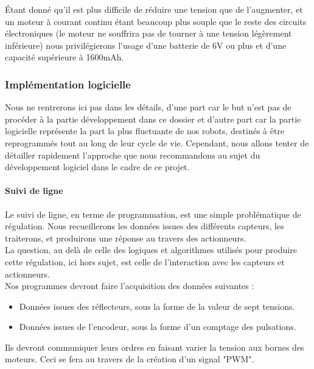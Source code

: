 			Étant donné qu'il est plus difficile de réduire une tension que de l'augmenter, et un moteur à courant continu étant beaucoup plus souple que le reste des circuits électroniques (le moteur ne souffrira pas de tourner à une tension légèrement inférieure) nous privilégierons l'usage d'une batterie de 6V ou plus et d'une capacité supérieure à 1600mAh.


	\subsubsection{Implémentation logicielle}

		Nous ne rentrerons ici pas dans les détails, d'une part car le but n'est pas de procéder à la partie développement dans ce dossier et d'autre part car la partie logicielle représente la part la plus fluctuante de nos robots, destinés à être reprogrammés tout au long de leur cycle de vie. Cependant, nous allons tenter de détailler rapidement l'approche que nous recommandons au sujet du développement logiciel dans le cadre de ce projet.

		\paragraph{Suivi de ligne}

			Le suivi de ligne, en terme de programmation, est une simple problématique de régulation. Nous recueillerons les données issues des différents capteurs, les traiterons, et produirons une réponse au travers des actionneurs.\\

			La question, au delà de celle des logiques et algorithmes utilisés pour produire cette régulation, ici hors sujet, est celle de l’interaction avec les capteurs et actionneurs.\\

			Nos programmes devront faire l'acquisition des données suivantes :
			\begin{itemize}
				\item Données issues des réflecteurs, sous la forme de la valeur de sept tensions.
				\item Données issues de l'encodeur, sous la forme d'un comptage des pulsations.
			\end{itemize}

			Ils devront communiquer leurs ordres en faisant varier la tension aux bornes des moteurs. Ceci se fera au travers de la création d'un signal "PWM".\\

